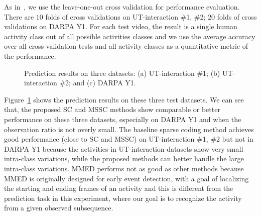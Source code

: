 As in~\cite{Ryoo2011}, we use the leave-one-out cross validation for
performance evaluation.  There are $10$ folds of cross validations on
UT-interaction \#1, \#2; $20$ folds of cross validations on DARPA Y1.  For each
test video, the result is a single human activity class out of all possible
activities classes and we use the average accuracy over all cross validation
tests and all activity classes as a quantitative metric of the performance.
\begin{figure}[htbp]
  \centering
  \caption{Prediction results on three datasets: (a) UT-interaction \#1; (b) UT-interaction \#2; and (c) DARPA Y1.}
  \vspace{-4mm}
  \label{fig:prediction_results}
\end{figure}

Figure~\ref{fig:prediction_results} shows {\color{black}the prediction results}
on these three test datasets.  We can see that, the proposed SC and MSSC
methods show comparable or better performance on these three datasets,
especially on DARPA Y1 and when the observation ratio is not overly small.  The
baseline sparse coding method achieves good performance (close to SC and MSSC)
on UT-interaction \#1, \#2 but not in DARPA Y1 because the activities in
UT-interaction datasets show very small intra-class variations, while the
proposed methods can better handle the large intra-class variations. MMED
performs not as good as other methods because MMED is originally designed for
early event detection, with a goal of localizing the starting and ending frames
of an activity and this is different from the prediction task in this
experiment, where our goal is to recognize the activity from a given observed
subsequence.

